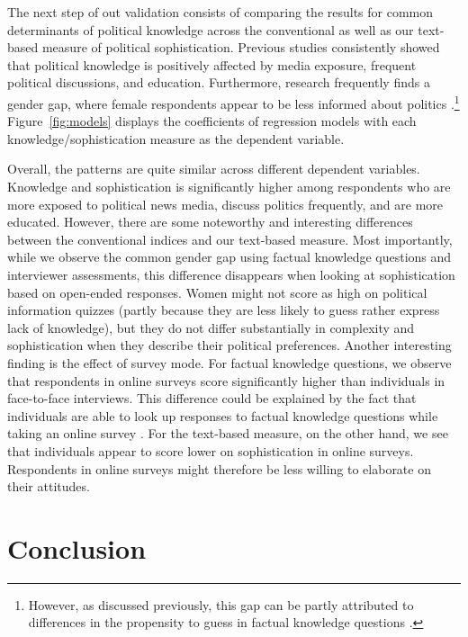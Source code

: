 \documentclass[12pt]{article}
\begin{document}
The next step of out validation consists of comparing the results for common determinants of political knowledge across the conventional as well as our text-based measure of political sophistication. Previous studies consistently showed that political knowledge is positively affected by media exposure, frequent political discussions, and education. Furthermore, research frequently finds a gender gap, where female respondents appear to be less informed about politics \citep[c.f.][]{barabas2014question}.\footnote{However, as discussed previously, this gap can be partly attributed to differences in the propensity to guess in factual knowledge questions \citep[e.g.][]{mondak2004knowledge}.} Figure~\ref{fig:models} displays the coefficients of regression models with each knowledge/sophistication measure as the dependent variable.

Overall, the patterns are quite similar across different dependent variables. Knowledge and sophistication is significantly higher among respondents who are more exposed to political news media, discuss politics frequently, and are more educated. However, there are some noteworthy and interesting differences between the conventional indices and our text-based measure. Most importantly, while we observe the common gender gap using factual knowledge questions and interviewer assessments, this difference disappears when looking at sophistication based on open-ended responses. Women might not score as high on political information quizzes (partly because they are less likely to guess rather express lack of knowledge), but they do not differ substantially in complexity and sophistication when they describe their political preferences. Another interesting finding is the effect of survey mode. For factual knowledge questions, we observe that respondents in online surveys score significantly higher than individuals in face-to-face interviews. This difference could be explained by the fact that individuals are able to look up responses to factual knowledge questions while taking an online survey \citep[see also]{clifford2016cheating}. For the text-based measure, on the other hand, we see that individuals appear to score lower on sophistication in online surveys. Respondents in online surveys might therefore be less willing to elaborate on their attitudes.


\section{Conclusion}
\end{document}
